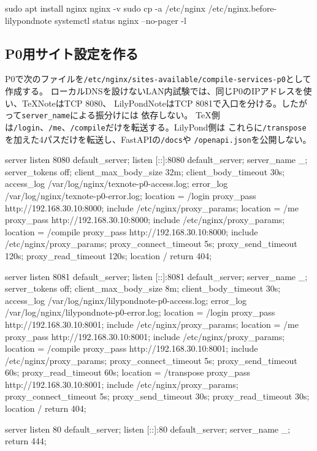 \documentclass[uplatex,a4paper,11pt]{jsarticle}
\begin{document}
\begin{command}
sudo apt install nginx
nginx -v
sudo cp -a /etc/nginx /etc/nginx.before-lilypondnote
systemctl status nginx --no-pager -l
\end{command}

\subsection{P0用サイト設定を作る}

P0で次のファイルを\texttt{/etc/nginx/sites-available/compile-services-p0}として作成する。
ローカルDNSを設けないLAN内試験では、同じP0のIPアドレスを使い、TeXNoteはTCP 8080、
LilyPondNoteはTCP 8081で入口を分ける。したがって\texttt{server\_name}による振分けには
依存しない。
TeX側は\texttt{/login}、\texttt{/me}、\texttt{/compile}だけを転送する。LilyPond側は
これらに\texttt{/transpose}を加えた4パスだけを転送し、FastAPIの\texttt{/docs}や
\texttt{/openapi.json}を公開しない。

\begin{command}
server {
    listen 8080 default_server;
    listen [::]:8080 default_server;
    server_name _;
    server_tokens off;
    client_max_body_size 32m;
    client_body_timeout 30s;
    access_log /var/log/nginx/texnote-p0-access.log;
    error_log  /var/log/nginx/texnote-p0-error.log;
    location = /login {
        proxy_pass http://192.168.30.10:8000;
        include /etc/nginx/proxy_params;
    }
    location = /me {
        proxy_pass http://192.168.30.10:8000;
        include /etc/nginx/proxy_params;
    }
    location = /compile {
        proxy_pass http://192.168.30.10:8000;
        include /etc/nginx/proxy_params;
        proxy_connect_timeout 5s;
        proxy_send_timeout 120s;
        proxy_read_timeout 120s;
    }
    location / {
        return 404;
    }
}

server {
    listen 8081 default_server;
    listen [::]:8081 default_server;
    server_name _;
    server_tokens off;
    client_max_body_size 8m;
    client_body_timeout 30s;
    access_log /var/log/nginx/lilypondnote-p0-access.log;
    error_log  /var/log/nginx/lilypondnote-p0-error.log;
    location = /login {
        proxy_pass http://192.168.30.10:8001;
        include /etc/nginx/proxy_params;
    }
    location = /me {
        proxy_pass http://192.168.30.10:8001;
        include /etc/nginx/proxy_params;
    }
    location = /compile {
        proxy_pass http://192.168.30.10:8001;
        include /etc/nginx/proxy_params;
        proxy_connect_timeout 5s;
        proxy_send_timeout 60s;
        proxy_read_timeout 60s;
    }
    location = /transpose {
        proxy_pass http://192.168.30.10:8001;
        include /etc/nginx/proxy_params;
        proxy_connect_timeout 5s;
        proxy_send_timeout 30s;
        proxy_read_timeout 30s;
    }
    location / {
        return 404;
    }
}

server {
    listen 80 default_server;
    listen [::]:80 default_server;
    server_name _;
    return 444;
}
\end{command}
\end{document}
